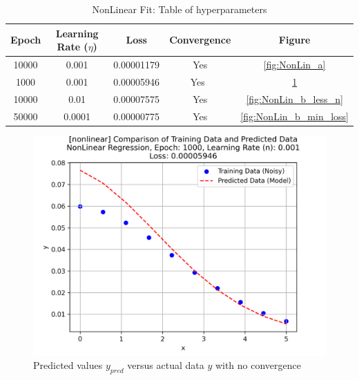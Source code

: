\documentclass[letterpaper, 10 pt, conference]{ieeeconf}  %
\begin{document}
\begin{table}[h]
   \centering
   \caption{NonLinear Fit: Table of hyperparameters}
   \label{tab:nonlin_param}
   \begin{tabular}{|c|c|c|c|c|}
      \hline
      Epoch & Learning Rate ($\eta$) & Loss & Convergence & Figure\\
      \hline
      10000 & 0.001 & 0.00001179 & Yes & \ref{fig:NonLin_a}\\
      \hline
      1000 & 0.001 & 0.00005946 & Yes\ & \ref{fig:NonLin_b_less_e}\\
      \hline
      10000 & 0.01 & 0.00007575 & Yes & \ref{fig:NonLin_b_less_n}\\
      \hline
      50000 & 0.0001 & 0.00000775 & Yes & \ref{fig:NonLin_b_min_loss}\\
      \hline
   \end{tabular}
   
\end{table}


\begin{figure}[h!]
   \centering
   \includegraphics[width=0.8\linewidth]{../Figures/nonlinear_regression_e_1000_n_0.001.png}
   \caption{Predicted values $y_{pred}$ versus actual data $y$ with no convergence}
   \label{fig:NonLin_b_less_e}
\end{figure}
\end{document}
